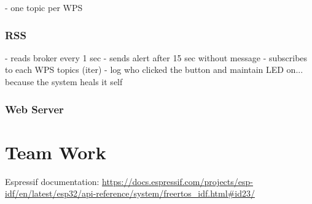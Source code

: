 \documentclass[11pt]{article}
\begin{document}
- one topic per WPS

\subsubsection{RSS}

- reads broker every 1 sec
- sends alert after 15 sec without message
- subscribes to each WPS topics (iter)
- log who clicked the button and maintain LED on... because the system heals it self 

\subsubsection{Web Server}

\section{Team Work}


\newpage
\begin{thebibliography}{8}

 Espressif documentation: {\url{https://docs.espressif.com/projects/esp-idf/en/latest/esp32/api-reference/system/freertos_idf.html#id23/}}

\end{thebibliography}
\end{document}
